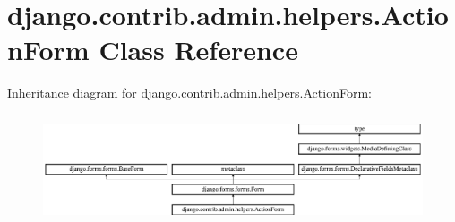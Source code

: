 \hypertarget{classdjango_1_1contrib_1_1admin_1_1helpers_1_1_action_form}{}\section{django.\+contrib.\+admin.\+helpers.\+Action\+Form Class Reference}
\label{classdjango_1_1contrib_1_1admin_1_1helpers_1_1_action_form}
Inheritance diagram for django.\+contrib.\+admin.\+helpers.\+Action\+Form\+:\begin{figure}[H]
\begin{center}
\leavevmode
\includegraphics[height=3.240741cm]{classdjango_1_1contrib_1_1admin_1_1helpers_1_1_action_form}
\end{center}
\end{figure}
